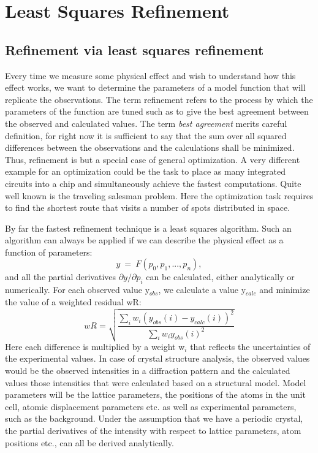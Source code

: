 
\chapter{Least Squares Refinement \label{lsq}}
\section{Refinement via least squares refinement \label{lsq-algo}}

Every time we measure some physical effect and wish to understand
how this effect works, we want to determine the parameters of a 
model function that will replicate the observations. The term 
refinement refers to the process by which the parameters of the
function are tuned such as to give the best agreement between
the observed and calculated values. The term {\it best agreement}
merits careful definition, for right now it is sufficient to say
that the sum over all squared differences between the observations and the 
calculations shall be minimized. Thus, refinement is but a special
case of general optimization. A very different example for an 
optimization could be the task to place as many integrated 
circuits into a chip and simultaneously achieve the fastest computations.
Quite well known is the traveling salesman problem. Here the 
optimization task requires to find the shortest route that 
visits a number of spots distributed in space.  

By far the fastest refinement technique is a least squares algorithm.
Such an algorithm can always be applied if we can describe the 
physical effect as a function of parameters:
\begin{equation}
  y ~=~ F(p_{0}, p_{1}, ..., p_{n}),
\end{equation}
and all the partial derivatives $\partial y/ \partial p_{i}$ can 
be calculated, either analytically or numerically. For each 
observed value y$_{obs}$, we calculate a value y$_{calc}$ and 
minimize the value of a weighted residual wR:
\begin{equation}
   wR = \sqrt{\frac{\sum_{i} w_{i} (y_{obs}(i) - y_{calc}(i))^2}
                   {\sum_{i} w_{i} y_{obs}(i)^2}}
  \label{diff-eq-rval}
\end{equation}
Here each difference is multiplied by a weight w$_{i}$ that reflects
the uncertainties of the experimental values. In case of crystal 
structure analysis, the observed values would be the observed 
intensities in a diffraction pattern and the calculated values 
those intensities that were calculated based on a structural model. 
Model parameters will be the lattice parameters, the positions
of the atoms in the unit cell, atomic displacement parameters etc.
as well as experimental parameters, such as the background.
Under the assumption that we have a periodic crystal, the 
partial derivatives of the intensity with respect to lattice
parameters, atom positions etc., can all be derived analytically.

